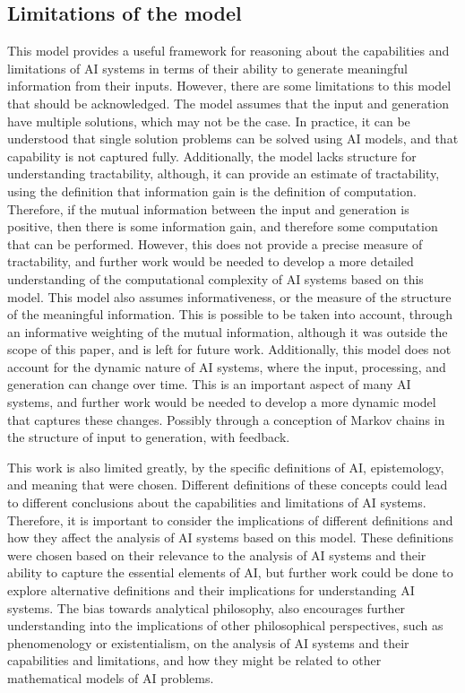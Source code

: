 \documentclass[stu,12pt]{apa7}
\theoremstyle{definition}
\begin{document}
\subsection{Limitations of the model}
This model provides a useful framework for reasoning about the capabilities and limitations of AI systems in terms of their ability to generate meaningful information from their inputs. However, there are some limitations to this model that should be acknowledged. The model assumes that the input and generation have multiple solutions, which may not be the case. In practice, it can be understood that single solution problems can be solved using AI models, and that capability is not captured fully. Additionally, the model lacks structure for understanding tractability, although, it can provide an estimate of tractability, using the definition that information gain is the definition of computation. Therefore, if the mutual information between the input and generation is positive, then there is some information gain, and therefore some computation that can be performed. However, this does not provide a precise measure of tractability, and further work would be needed to develop a more detailed understanding of the computational complexity of AI systems based on this model. This model also assumes informativeness, or the measure of the structure of the meaningful information. This is possible to be taken into account, through an informative weighting of the mutual information, although it was outside the scope of this paper, and is left for future work. Additionally, this model does not account for the dynamic nature of AI systems, where the input, processing, and generation can change over time. This is an important aspect of many AI systems, and further work would be needed to develop a more dynamic model that captures these changes. Possibly through a conception of Markov chains in the structure of input to generation, with feedback.

This work is also limited greatly, by the specific definitions of AI, epistemology, and meaning that were chosen. Different definitions of these concepts could lead to different conclusions about the capabilities and limitations of AI systems. Therefore, it is important to consider the implications of different definitions and how they affect the analysis of AI systems based on this model. These definitions were chosen based on their relevance to the analysis of AI systems and their ability to capture the essential elements of AI, but further work could be done to explore alternative definitions and their implications for understanding AI systems. The bias towards analytical philosophy, also encourages further understanding into the implications of other philosophical perspectives, such as phenomenology or existentialism, on the analysis of AI systems and their capabilities and limitations, and how they might be related to other mathematical models of AI problems.
\end{document}
